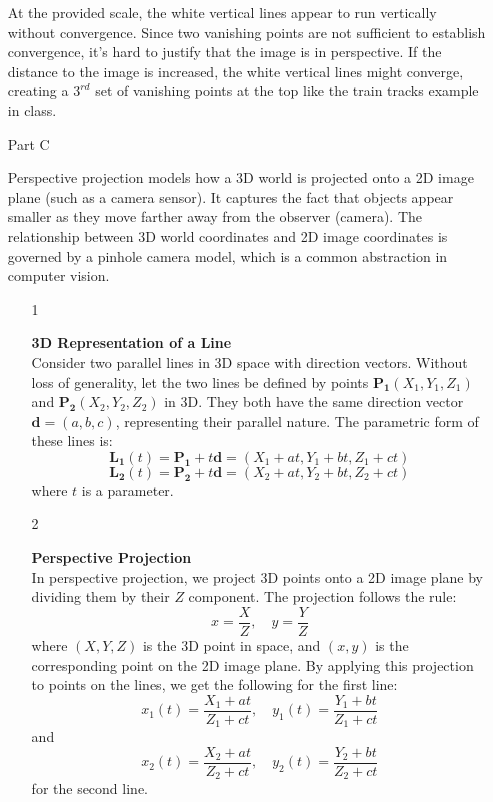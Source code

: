 \documentclass[12pt]{report}
\begin{document}
\begin{enumerate}
    At the provided scale, the white vertical lines appear to run vertically without convergence. Since two vanishing points are not sufficient to establish 
    convergence, it's hard to justify that the image is in perspective. If the distance to the image is increased, the white vertical lines might converge,
    creating a $3^{rd}$ set of vanishing points at the top like the train tracks example in class.

    \item[Part C]

    Perspective projection models how a 3D world is projected onto a 2D image plane (such as a camera sensor). It captures the fact that objects appear 
    smaller as they move farther away from the observer (camera). The relationship between 3D world coordinates and 2D image coordinates is governed by a 
    pinhole camera model, which is a common abstraction in computer vision.

    \begin{enumerate}
        \item[1] 
        
        \textbf{3D Representation of a Line} \\
        Consider two parallel lines in 3D space with direction vectors. Without loss of generality, let the two lines be defined by points \(\mathbf{P_1}(X_1, Y_1, Z_1)\) 
        and \(\mathbf{P_2}(X_2, Y_2, Z_2)\) in 3D. They both have the same direction vector \(\mathbf{d} = (a, b, c)\), representing their parallel nature.
        The parametric form of these lines is:
        \[
        \mathbf{L_1}(t) = \mathbf{P_1} + t \mathbf{d} = (X_1 + at, Y_1 + bt, Z_1 + ct)
        \]
        \[
        \mathbf{L_2}(t) = \mathbf{P_2} + t \mathbf{d} = (X_2 + at, Y_2 + bt, Z_2 + ct)
        \]
        where \(t\) is a parameter.

        \item[2] 
        
        \textbf{Perspective Projection} \\
        In perspective projection, we project 3D points onto a 2D image plane  by dividing them by their $Z$ component. The projection follows the rule:
        \[
        x = \frac{X}{Z}, \quad y = \frac{Y}{Z}
        \]
        where \((X, Y, Z)\) is the 3D point in space, and \((x, y)\) is the corresponding point on the 2D image plane. By applying this projection to points 
        on the lines, we get the following for the first line:
        \[
        x_1(t) = \frac{X_1 + at}{Z_1 + ct}, \quad y_1(t) = \frac{Y_1 + bt}{Z_1 + ct}
        \]
        and
        \[
        x_2(t) = \frac{X_2 + at}{Z_2 + ct}, \quad y_2(t) = \frac{Y_2 + bt}{Z_2 + ct}
        \]
        for the second line.


\end{enumerate}
\end{enumerate}
\end{document}

